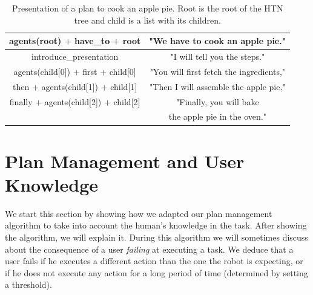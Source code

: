  \begin{table}
\centering
\scriptsize
\renewcommand{\arraystretch}{1.3}
\begin{tabular}{c|c}
   agents(root) $+$ have\_to $+$ root  & "We have to cook an apple pie." \\
   \hline
   introduce\_presentation & "I will tell you the steps." \\
   \hline
   agents(child[0]) $+$ first $+$ child[0] & "You will first fetch the ingredients," \\
   \hline
   then $+$ agents(child[1]) $+$  child[1] & "Then I will assemble the apple pie," \\
   \hline
   finally $+$ agents(child[2]) $+$  child[2] & "Finally, you will bake \\
   & the apple pie in the oven." \\
\end{tabular}
\caption[Presentation of a plan to cook an apple pie]{Presentation of a plan to cook an apple pie. Root is the root of the HTN tree and child is a list with its children.}
 \label{table:knowledge-pie-present}    
\end{table}


\section{Plan Management and User Knowledge}
\label{sec:knowledge-plan_management}
We start this section by showing how we adapted our plan management algorithm to take into account the human's knowledge in the task. After showing the algorithm, we will explain it. During this algorithm we will sometimes discuss about the consequence of a user \textit{failing} at executing a task. We deduce that a user fails if he executes a different action than the one the robot is expecting, or if he does not execute any action for a long period of time (determined by setting a threshold).

